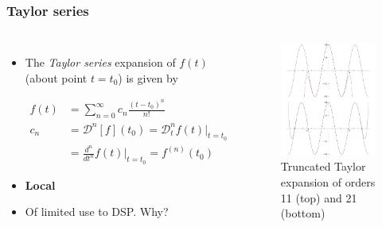 \documentclass{beamer}
\begin{document}
\begin{frame}
\frametitle{Taylor series}
\begin{columns}[c]
\begin{itemize}
	\item The \textit{Taylor series} expansion of $f(t)$ (about point $t=t_0$) is given by

	\begin{align*}
		f(t)	&= \sum_{n=0}^{\infty} c_n \frac{(t-t_0)^n}{n!} \\
		c_n		&= \mathcal{D}^n[f](t_0) = \mathcal{D}_t^n f(t) |_{t=t_0} \\
				&= \frac{d^n}{dt^n} f(t) |_{t=t_0} = f^{(n)}(t_0)
	\end{align*}
	\item \textbf{Local}
	\item Of limited use to DSP. \alert{Why?}
\end{itemize}
\begin{figure} %
\centering
	\includegraphics[width=\columnwidth]{../figures/taylor}
\caption{Truncated Taylor expansion of orders 11 (top) and 21 (bottom)}
\end{figure}
\end{columns}

\end{frame}
\end{document}
